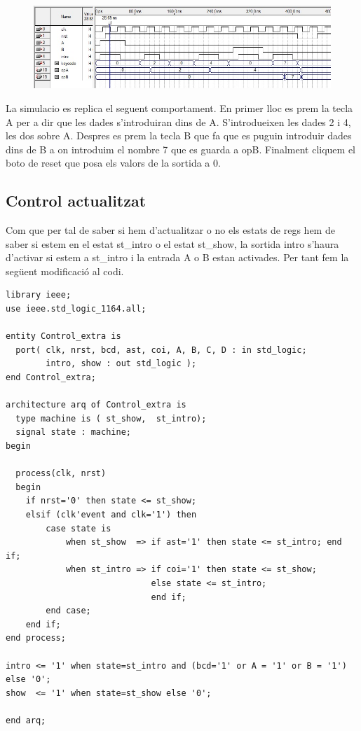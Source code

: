 \documentclass[12pt, a4papre]{article}
\begin{document}
	\begin{figure}[H]
		\begin{center}
		\includegraphics[width=130mm]{regsExtrSim.jpeg}
		\end{center}
	\end{figure}
	
	La simulacio es replica el seguent comportament. En primer lloc es prem la tecla A per a dir que les dades s'introduiran dins de A. S'introdueixen les dades 2 i 4, les dos sobre A. Despres es prem la tecla B que fa que es puguin introduir dades dins de B a on introduim el nombre 7 que es guarda a opB. Finalment cliquem el boto de reset que posa els valors de la sortida a 0.
	
	\subsection{Control actualitzat}
	
	Com que per tal de saber si hem d'actualitzar o no els estats de regs hem de saber si estem en el estat st\_intro o el estat st\_show, la sortida intro s'haura d'activar si estem a st\_intro i la entrada A o B estan activades. Per tant fem la següent modificació al codi.
	
			\begin{lstlisting}[style=vhdl, frame=single, basicstyle=\tiny]
library ieee;
use ieee.std_logic_1164.all;

entity Control_extra is
  port( clk, nrst, bcd, ast, coi, A, B, C, D : in std_logic;
		intro, show : out std_logic );
end Control_extra;

architecture arq of Control_extra is
  type machine is ( st_show,  st_intro);
  signal state : machine;
begin

  process(clk, nrst) 
  begin
	if nrst='0' then state <= st_show;
	elsif (clk'event and clk='1') then
		case state is
			when st_show  => if ast='1' then state <= st_intro; end if;
			when st_intro => if coi='1' then state <= st_show; 
							 else state <= st_intro;
							 end if;
		end case;
	end if;
end process;

intro <= '1' when state=st_intro and (bcd='1' or A = '1' or B = '1') else '0';
show  <= '1' when state=st_show else '0';

end arq;
\end{lstlisting}
\end{document}
